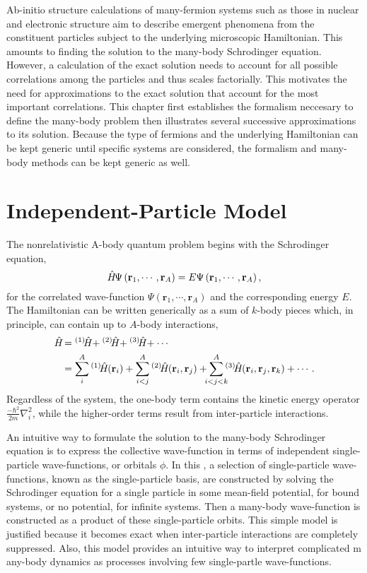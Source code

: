 \documentclass[thesis.tex]{subfiles}
\begin{document}
Ab-initio structure calculations of many-fermion systems such as those in nuclear and electronic structure aim to describe emergent phenomena from the constituent particles subject to the underlying microscopic Hamiltonian.  This amounts to finding the solution to the many-body Schrodinger equation.  However, a calculation of the exact solution needs to account for all possible correlations among the particles and thus scales factorially.  This motivates the need for approximations to the exact solution that account for the most important correlations.  This chapter first establishes the formalism neccesary to define the many-body problem then illustrates several successive approximations to its solution.  Because the type of fermions and the underlying Hamiltonian can be kept generic until specific systems are considered, the formalism and many-body methods can be kept generic as well.


\section{Independent-Particle Model}
The nonrelativistic A-body quantum problem begins with the Schrodinger equation,
\begin{equation}
  \hat{H}\hspace{-1.5pt}\Psi\left(\mathbf{r}_{1},\cdots,\mathbf{r}_{A}\right) = E\Psi\left(\mathbf{r}_{1},\cdots,\mathbf{r}_{A}\right),
\end{equation}
for the correlated wave-function $\Psi\left(\mathbf{r}_{1},\cdots,\mathbf{r}_{A}\right)$ and the corresponding energy $E$.  The Hamiltonian can be written generically as a sum of $k$-body pieces which, in principle, can contain up to $A$-body interactions,
\begin{align}
  \Ham &= \HamB{1} + \HamB{2} + \HamB{3} + \cdots \notag \\
  &= \sum^{A}_{\mathclap{i}}\HamB{1}\left(\mathbf{r}_{i}\right) + \sum^{A}_{\mathclap{i<j}}\HamB{2}\left(\mathbf{r}_{i},\mathbf{r}_{j}\right) + \sum^{A}_{\mathclap{i<j<k}}\HamB{3}\left(\mathbf{r}_{i},\mathbf{r}_{j},\mathbf{r}_{k}\right) + \cdots.
\end{align}
Regardless of the system, the one-body term contains the kinetic energy operator $\frac{-\hbar^{2}}{2m}\nabla^{2}_{i}$, while the higher-order terms result from inter-particle interactions.

An intuitive way to formulate the solution to the many-body Schrodinger equation is to express the collective wave-function in terms of independent single-particle wave-functions, or orbitals $\phi$.  In this , a selection of single-particle wave-functions, known as the single-particle basis, are constructed by solving the Schrodinger equation for a single particle in some mean-field potential, for bound systems, or no potential, for infinite systems.  Then a many-body wave-function is constructed as a product of these single-particle orbits.  This simple model is justified because it becomes exact when inter-particle interactions are completely suppressed.  Also, this model provides an intuitive way to interpret complicated m any-body dynamics as processes involving few single-partle wave-functions.
\end{document}
